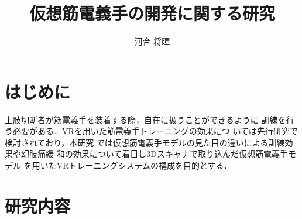 \documentclass{ltjsarticle}
\title{仮想筋電義手の開発に関する研究}
\author{河合 将暉}
\begin{document}
\maketitle

\section{はじめに}
	上肢切断者が筋電義手を装着する際，自在に扱うことができるように
	訓練を行う必要がある．VRを用いた筋電義手トレーニングの効果につ
	いては先行研究\cite{ref:1}\cite{ref:2}で検討されており，本研究
	では仮想筋電義手モデルの見た目の違いによる訓練効果や幻肢痛緩
	和の効果について着目し3Dスキャナで取り込んだ仮想筋電義手モデル
	を用いたVRトレーニングシステムの構成を目的とする．
	\vspace{-10pt}

\section{研究内容}
\end{document}
